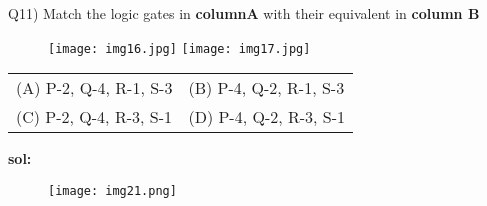 \documentclass{article}
\begin{document}
{\fontsize{13}{16}\selectfont
Q11) Match the logic gates in  \textbf{columnA} with their equivalent in \textbf{column B}} 
\begin{figure}[h]
    \centering
    \texttt{[image: img16.jpg]}
    \texttt{[image: img17.jpg]}
\end{figure}

\centering
{\fontsize{14}{16}\selectfont
\begin{tabular}{ll}
(A) P-2, Q-4, R-1, S-3 &       (B) P-4, Q-2, R-1, S-3 \\
(C) P-2, Q-4, R-3, S-1 &       (D) P-4, Q-2, R-3, S-1 \\
\end{tabular}
}
\begin{flushleft}
  {\fontsize{13}{16}\selectfont
\textbf {sol:}} 
\end{flushleft}


\begin{figure}[h]
    \centering
    \texttt{[image: img21.png]}
\end{figure}
\end{document}

